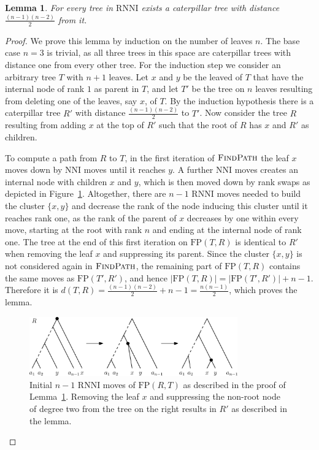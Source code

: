 \documentclass[11pt]{amsart}
\newtheorem{lemma}{Lemma}
\newcommand{\rnni}{\mathrm{RNNI}}
\newcommand{\findpath}{\textsc{FindPath}}
\newcommand{\nni}{\mathrm{NNI}}
\newcommand{\fp}{\mathrm{FP}}
\begin{document}
\begin{lemma}
	For every tree in $\rnni$ exists a caterpillar tree with distance $\frac{(n-1)(n-2)}{2}$ from it.
	\label{lemma:max_dist_tree_rnni}
\end{lemma}

\begin{proof}
	We prove this lemma by induction on the number of leaves $n$.
	The base case $n=3$ is trivial, as all three trees in this space are caterpillar trees with distance one from every other tree.
	For the induction step we consider an arbitrary tree $T$ with $n+1$ leaves.
	Let $x$ and $y$ be the leaved of $T$ that have the internal node of rank $1$ as parent in $T$, and let $T'$ be the tree on $n$ leaves resulting from deleting one of the leaves, say $x$, of $T$.
	By the induction hypothesis there is a caterpillar tree $R'$ with distance $\frac{(n-1)(n-2)}{2}$ to $T'$.
	Now consider the tree $R$ resulting from adding $x$ at the top of $R'$ such that the root of $R$ has $x$ and $R'$ as children.

	To compute a path from $R$ to $T$, in the first iteration of $\findpath$ the leaf $x$ moves down by $\nni$ moves until it reaches $y$.
	A further $\nni$ moves creates an internal node with children $x$ and $y$, which is then moved down by rank swaps as depicted in Figure~\ref{fig:max_dist_ctree}.
	Altogether, there are $n-1$ $\rnni$ moves needed to build the cluster $\{x,y\}$ and decrease the rank of the node inducing this cluster until it reaches rank one, as the rank of the parent of $x$ decreases by one within every move, starting at the root with rank $n$ and ending at the internal node of rank one.
	The tree at the end of this first iteration on $\fp(T,R)$ is identical to $R'$ when removing the leaf $x$ and suppressing its parent.
	Since the cluster $\{x,y\}$ is not considered again in $\findpath$, the remaining part of $\fp(T,R)$ contains the same moves as $\fp(T',R')$, and hence $|\fp(T,R)| = |\fp(T',R')| + n-1$.
	Therefore it is $d(T,R) = \frac{(n-1)(n-2)}{2} + n-1 = \frac{n(n-1)}{2}$, which proves the lemma.
	\begin{figure}[ht]
		\includegraphics[width=0.8\textwidth]{max_dist_ctree.eps}
		\caption{Initial $n - 1$ $\rnni$ moves of $\fp(R,T)$ as described in the proof of Lemma~\ref{lemma:max_dist_tree_rnni}.
		Removing the leaf $x$ and suppressing the non-root node of degree two from the tree on the right results in $R'$ as described in the lemma.}
		\label{fig:max_dist_ctree}
	\end{figure}
\end{proof}
\end{document}
